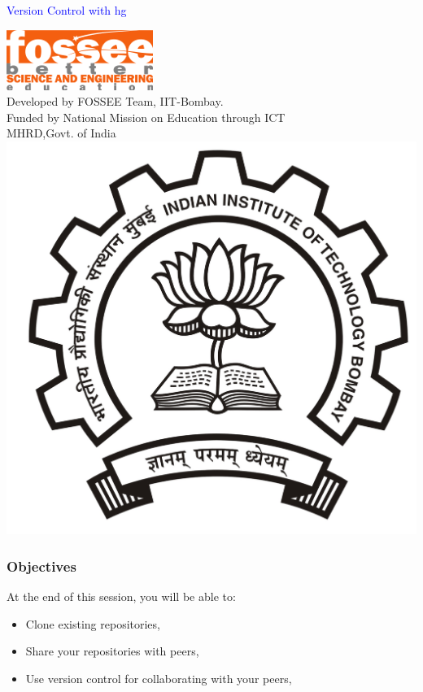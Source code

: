 \documentclass[12pt,compress]{beamer}
\begin{document}
\begin{frame}

\begin{center}
\vspace{12pt}
\textcolor{blue}{\huge Version Control with hg}
\end{center}
\vspace{18pt}
\begin{center}
\vspace{10pt}
\includegraphics[scale=0.95]{../images/fossee-logo.png}\\
\vspace{5pt}
\scriptsize Developed by FOSSEE Team, IIT-Bombay. \\ 
\scriptsize Funded by National Mission on Education through ICT\\
\scriptsize  MHRD,Govt. of India\\
\includegraphics[scale=0.30]{../images/iitb-logo.jpg}\\
\end{center}
\end{frame}

\begin{frame}
  \frametitle{Objectives}
\label{sec-2}
  At the end of this session, you will be able to:
  \begin{itemize}
  \item Clone existing repositories,
  \item Share your repositories with peers,
  \item Use version control for collaborating with your peers,
  \end{itemize}
\end{frame}
\end{document}
